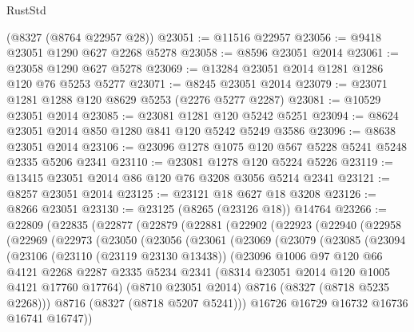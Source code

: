 \begin{lexlean}{RustStd}
\begin{coremodule}
    (@8327 (@8764 @22957 @28))
@23051 := @11516 @22957
@23056 := @9418 @23051 @1290 @627 @2268 @5278
@23058 := @8596 @23051 @2014
@23061 := @23058 @1290 @627 @5278
@23069 := @13284 @23051 @2014 @1281 @1286 @120 @76 @5253 @5277
@23071 := @8245 @23051 @2014
@23079 := @23071 @1281 @1288 @120 @8629 @5253 (@2276 @5277 @2287)
@23081 := @10529 @23051 @2014
@23085 := @23081 @1281 @120 @5242 @5251
@23094 := @8624 @23051 @2014 @850 @1280 @841 @120 @5242 @5249 @3586
@23096 := @8638 @23051 @2014
@23106 := @23096 @1278 @1075 @120 @567 @5228 @5241 @5248 @2335 @5206 @2341
@23110 := @23081 @1278 @120 @5224 @5226
@23119 := @13415 @23051 @2014 @86 @120 @76 @3208 @3056 @5214 @2341
@23121 := @8257 @23051 @2014
@23125 := @23121 @18 @627 @18 @3208
@23126 := @8266 @23051
@23130 := @23125 (@8265 (@23126 @18)) @14764
@23266 := @22809
    (@22835
      (@22877
        (@22879
          (@22881
            (@22902
              (@22923
                (@22940
                  (@22958
                    (@22969
                      (@22973
                        (@23050
                          (@23056
                            (@23061
                              (@23069
                                (@23079
                                  (@23085
                                    (@23094
                                      (@23106
                                        (@23110 (@23119 @23130 @13438))
                                        (@23096
                                          @1006
                                          @97
                                          @120
                                          @66
                                          @4121
                                          @2268
                                          @2287
                                          @2335
                                          @5234
                                          @2341
                                          (@8314 @23051 @2014 @120 @1005 @4121 @17760 @17764)
                                          (@8710 @23051 @2014)
                                          @8716
                                          (@8327 (@8718 @5235 @2268)))
                                        @8716
                                        (@8327 (@8718 @5207 @5241)))
                                      @16726
                                      @16729
                                      @16732
                                      @16736
                                      @16741
                                      @16747))

\end{coremodule}
\end{lexlean}

